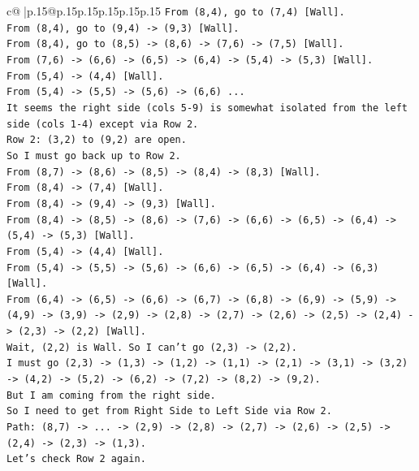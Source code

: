 \documentclass{article}
\begin{document}
{\begin{supertabular}{c@{$\;$}|p{.15\linewidth}@{}p{.15\linewidth}p{.15\linewidth}p{.15\linewidth}p{.15\linewidth}p{.15\linewidth}}
{{{\texttt{From (8,4), go to (7,4) {[}Wall{]}.} \\
\texttt{From (8,4), go to (9,4) {-}> (9,3) {[}Wall{]}.} \\
\texttt{From (8,4), go to (8,5) {-}> (8,6) {-}> (7,6) {-}> (7,5) {[}Wall{]}.} \\
\texttt{From (7,6) {-}> (6,6) {-}> (6,5) {-}> (6,4) {-}> (5,4) {-}> (5,3) {[}Wall{]}.} \\
\texttt{From (5,4) {-}> (4,4) {[}Wall{]}.} \\
\texttt{From (5,4) {-}> (5,5) {-}> (5,6) {-}> (6,6) ...} \\
\texttt{It seems the right side (cols 5{-}9) is somewhat isolated from the left side (cols 1{-}4) except via Row 2.} \\
\texttt{Row 2: (3,2) to (9,2) are open.} \\
\texttt{So I must go back up to Row 2.} \\
\texttt{From (8,7) {-}> (8,6) {-}> (8,5) {-}> (8,4) {-}> (8,3) {[}Wall{]}.} \\
\texttt{From (8,4) {-}> (7,4) {[}Wall{]}.} \\
\texttt{From (8,4) {-}> (9,4) {-}> (9,3) {[}Wall{]}.} \\
\texttt{From (8,4) {-}> (8,5) {-}> (8,6) {-}> (7,6) {-}> (6,6) {-}> (6,5) {-}> (6,4) {-}> (5,4) {-}> (5,3) {[}Wall{]}.} \\
\texttt{From (5,4) {-}> (4,4) {[}Wall{]}.} \\
\texttt{From (5,4) {-}> (5,5) {-}> (5,6) {-}> (6,6) {-}> (6,5) {-}> (6,4) {-}> (6,3) {[}Wall{]}.} \\
\texttt{From (6,4) {-}> (6,5) {-}> (6,6) {-}> (6,7) {-}> (6,8) {-}> (6,9) {-}> (5,9) {-}> (4,9) {-}> (3,9) {-}> (2,9) {-}> (2,8) {-}> (2,7) {-}> (2,6) {-}> (2,5) {-}> (2,4) {-}> (2,3) {-}> (2,2) {[}Wall{]}.} \\
\texttt{Wait, (2,2) is Wall. So I can't go (2,3) {-}> (2,2).} \\
\texttt{I must go (2,3) {-}> (1,3) {-}> (1,2) {-}> (1,1) {-}> (2,1) {-}> (3,1) {-}> (3,2) {-}> (4,2) {-}> (5,2) {-}> (6,2) {-}> (7,2) {-}> (8,2) {-}> (9,2).} \\
\texttt{But I am coming from the right side.} \\
\texttt{So I need to get from Right Side to Left Side via Row 2.} \\
\texttt{Path: (8,7) {-}> ... {-}> (2,9) {-}> (2,8) {-}> (2,7) {-}> (2,6) {-}> (2,5) {-}> (2,4) {-}> (2,3) {-}> (1,3).} \\
\texttt{Let's check Row 2 again.} \\
}}}
\end{supertabular}}
\end{document}
